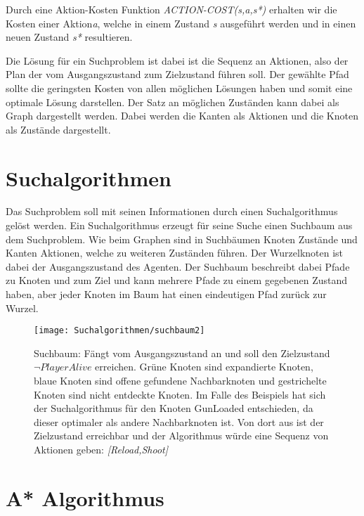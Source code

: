 Durch eine Aktion-Kosten Funktion \textit{ACTION-COST(s,a,s*)} erhalten wir die Kosten einer Aktion\textit{a}, welche in einem Zustand \textit{s} ausgeführt werden und in einen neuen Zustand \textit{s*} resultieren.

Die Lösung für ein Suchproblem ist dabei ist die Sequenz an Aktionen, also der Plan der vom Ausgangszustand zum Zielzustand führen soll. Der gewählte Pfad sollte die geringsten Kosten von allen möglichen Lösungen haben und somit eine optimale Lösung darstellen. Der Satz an möglichen Zuständen kann dabei als Graph dargestellt werden. Dabei werden die Kanten als Aktionen und die Knoten als Zustände dargestellt.

\section{Suchalgorithmen}
Das Suchproblem soll mit seinen Informationen durch einen Suchalgorithmus gelöst werden. Ein Suchalgorithmus erzeugt für seine Suche einen Suchbaum aus dem Suchproblem. Wie beim Graphen sind in Suchbäumen Knoten Zustände und Kanten Aktionen, welche zu weiteren Zuständen führen. Der Wurzelknoten ist dabei der Ausgangszustand des Agenten. Der Suchbaum beschreibt dabei Pfade zu Knoten und zum Ziel und kann mehrere Pfade zu einem gegebenen Zustand haben, aber jeder Knoten im Baum hat einen eindeutigen Pfad zurück zur Wurzel.

\begin{figure}[h]
  \centering
  \texttt{[image: Suchalgorithmen/suchbaum2]}
	\captionsetup{justification=justified, format=plain}
  \caption{Suchbaum: Fängt vom Ausgangszustand an und soll den Zielzustand $\lnot \textit{PlayerAlive}$ erreichen. Grüne Knoten sind expandierte Knoten, blaue Knoten sind offene gefundene Nachbarknoten und gestrichelte Knoten sind nicht entdeckte Knoten. Im Falle des Beispiels hat sich der Suchalgorithmus für den Knoten GunLoaded entschieden, da dieser optimaler als andere Nachbarknoten ist. Von dort aus ist der Zielzustand erreichbar und der Algorithmus würde eine Sequenz von Aktionen geben: \textit{[Reload,Shoot]}}
\end{figure}

\section{A* Algorithmus}

